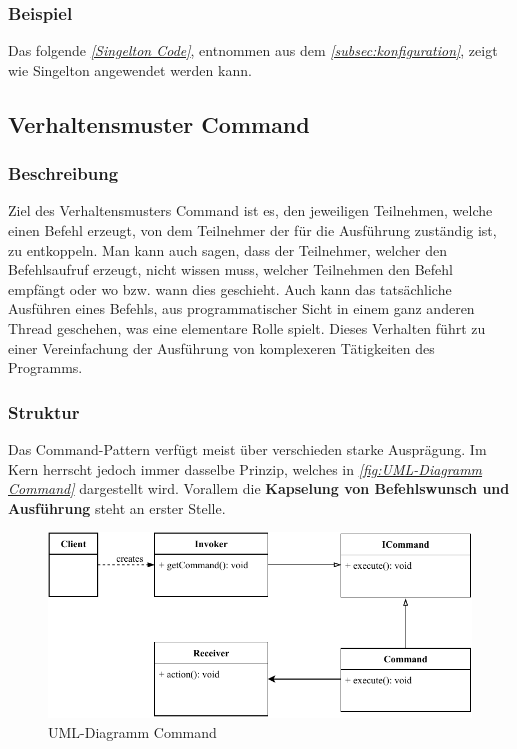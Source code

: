 \subsubsection{Beispiel}
Das folgende \textit{\autoref{Singelton Code}}, entnommen aus dem \textit{\autoref{subsec:konfiguration}}, zeigt wie Singelton angewendet werden kann.



\subsection{Verhaltensmuster Command}\label{subsec:verhaltensmuster-command}
\subsubsection{Beschreibung}
Ziel des Verhaltensmusters Command ist es, den jeweiligen Teilnehmen, welche einen Befehl erzeugt, von dem Teilnehmer der für die Ausführung zuständig ist, zu entkoppeln.
Man kann auch sagen, dass der Teilnehmer, welcher den Befehlsaufruf erzeugt, nicht wissen muss, welcher Teilnehmen den Befehl empfängt oder wo bzw. wann dies geschieht.
Auch kann das tatsächliche Ausführen eines Befehls, aus programmatischer Sicht in einem ganz anderen Thread geschehen, was eine elementare Rolle spielt.
Dieses Verhalten führt zu einer Vereinfachung der Ausführung von komplexeren Tätigkeiten des Programms.
\subsubsection{Struktur}
Das Command-Pattern verfügt meist über verschieden starke Ausprägung.
Im Kern herrscht jedoch immer dasselbe Prinzip, welches in \textit{\autoref{fig:UML-Diagramm Command}} dargestellt wird.
Vorallem die \textbf{Kapselung von Befehlswunsch und Ausführung} steht an erster Stelle.
\begin{figure}[htb!]
    \centering
    \includegraphics[width=1\textwidth]{fig/ainf/Command.pdf}
    \caption{UML-Diagramm Command}
    \label{fig:UML-Diagramm Command}
\end{figure}
